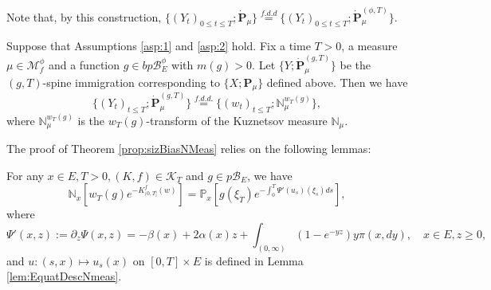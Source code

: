 	Note that, by this construction, $\{(Y_t)_{0 \leq t \leq T}; \dot {\mathbf P}_\mu\} \overset{f.d.d}{=} \{(Y_t)_{0\leq t\leq T}; \dot{\mathbf P}^{(\phi,T)}_\mu\}$.
\begin{thm}\label{prop:sizBiasNMeas}
	Suppose that Assumptions \ref{asp:1} and \ref{asp:2} hold.
	Fix a time $T>0$, a measure $\mu \in \mathcal M_f^\phi$ and a function $g \in bp\mathscr B^\phi_E$ with $m(g) > 0$.
	Let $\{Y; \dot {\mathbf P}^{(g,T)}_\mu\}$ be the $(g,T)$-spine immigration corresponding to $\{X; \mathbf P_\mu\}$ defined above.
	Then we have
\[
	\{(Y_t)_{t\leq T}; \dot{\mathbf P}^{(g,T)}_\mu\}
	\overset{f.d.d.}{=} \{(w_t)_{t\leq T}; \mathbb N_\mu^{w_T(g)}\},
\]
	where $\mathbb N_{\mu}^{w_T(g)}$ is the $w_T(g)$-transform of the Kuznetsov measure $\mathbb N_\mu$.
\end{thm}
	The proof of Theorem \ref{prop:sizBiasNMeas} relies on the following lemmas:
\begin{lem}\label{lem:relSpinNMeas}
	For any $x\in E, T>0, (K,f) \in \mathcal K_T$ and $g \in p\mathscr B_E$, we have
\begin{equation}\label{eq:relSpinNMeas}
	\mathbb N_x[w_T(g) e^{-K_{(0, T]}^f(w)}]
	= \mathbb P_x[g(\xi_T) e^{-\int_0^T \Psi'(u_s)(\xi_s) ds}],
\end{equation}
	where
\[
	\Psi'(x,z)
	:= \partial_z \Psi(x,z)
	= - \beta(x) + 2 \alpha(x) z + \int_{(0,\infty)} (1 - e^{-yz}) y \pi(x,dy),
	\quad x \in E, z \geq 0,
\]
	and $u: (s,x) \mapsto u_s(x)$ on $[0,T] \times E$ is defined in Lemma \ref{lem:EquatDescNmeas}.
\end{lem}
